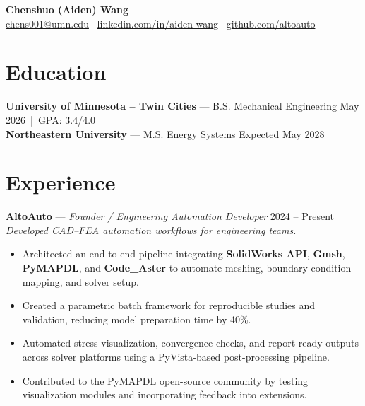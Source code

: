 \documentclass[10pt, letterpaper]{article}
\begin{document}
\begin{center}
    {\LARGE \textbf{Chenshuo (Aiden) Wang}}\\[3pt]
    \href{mailto:chens001@umn.edu}{chens001@umn.edu} \textbar\ 
    \href{https://linkedin.com/in/aiden-wang-964082354}{linkedin.com/in/aiden-wang} \textbar\ 
    \href{https://github.com/altoauto}{github.com/altoauto}
\end{center}
\vspace{-5mm}

\section*{Education}
\textbf{University of Minnesota – Twin Cities} — B.S. Mechanical Engineering \hfill May 2026 \,|\, GPA: 3.4/4.0 \\
\textbf{Northeastern University} — M.S. Energy Systems \hfill Expected May 2028

\section{Experience}
\textbf{AltoAuto} --- \textit{Founder / Engineering Automation Developer} \hfill 2024 -- Present\\
\vspace{0.1mm}
\textit{Developed CAD--FEA automation workflows for engineering teams.}
\begin{itemize}[leftmargin=1.5em, itemsep=2pt, topsep=2pt]
    \item Architected an end-to-end pipeline integrating \textbf{SolidWorks API}, \textbf{Gmsh}, \textbf{PyMAPDL}, and \textbf{Code\_Aster} to automate meshing, boundary condition mapping, and solver setup.
    \item Created a parametric batch framework for reproducible studies and validation, reducing model preparation time by 40\%.
    \item Automated stress visualization, convergence checks, and report-ready outputs across solver platforms using a PyVista-based post-processing pipeline.
    \item Contributed to the PyMAPDL open-source community by testing visualization modules and incorporating feedback into extensions.
\end{itemize}

\vspace{+1.5mm}
\end{document}
